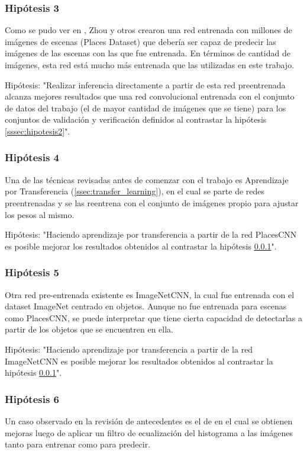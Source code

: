 \subsubsection{Hipótesis 3} \label{sssec:hipotesis3}
Como se pudo ver en \cite{learning_deep_features}, Zhou y otros crearon una red entrenada con millones de imágenes de escenas (Places Dataset) que debería ser capaz de predecir las imágenes de las escenas con las que fue entrenada. En términos de cantidad de imágenes, esta red está mucho más entrenada que las utilizadas en este trabajo. 

Hipótesis: "Realizar inferencia directamente a partir de esta red preentrenada alcanza mejores resultados que una red convolucional entrenada con el conjunto de datos del trabajo \cite{vision_based_real_estate_price_estimation} (el de mayor cantidad de imágenes que se tiene) para los conjuntos de validación y verificación definidos al contrastar la hipótesis \ref{sssec:hipotesis2}".

\subsubsection{Hipótesis 4} \label{sssec:hipotesis4}
Una de las técnicas revisadas antes de comenzar con el trabajo es Aprendizaje por Transferencia (\ref{ssec:transfer_learning}), en el cual se parte de redes preentrenadas y se las reentrena con el conjunto de imágenes propio para ajustar los pesos al mismo. 

Hipótesis: "Haciendo aprendizaje por transferencia a partir de la red PlacesCNN es posible mejorar los resultados obtenidos al contrastar la hipótesis \ref{sssec:hipotesis3}".


\subsubsection{Hipótesis 5} \label{sssec:hipotesis5}
Otra red pre-entrenada existente es ImageNetCNN, la cual fue entrenada con el dataset ImageNet centrado en objetos. Aunque no fue entrenada para escenas como PlacesCNN, se puede interpretar que tiene cierta capacidad de detectarlas a partir de los objetos que se encuentren en ella. 

Hipótesis: "Haciendo aprendizaje por transferencia a partir de la red ImageNetCNN es posible mejorar los resultados obtenidos al contrastar la hipótesis \ref{sssec:hipotesis3}".

\subsubsection{Hipótesis 6} \label{sssec:hipotesis6}
Un caso observado en la revisión de antecedentes es el de \cite{lstm_real_estate} en el cual se obtienen mejoras luego de aplicar un filtro de ecualización del histograma a las imágenes tanto para entrenar como para predecir. 

